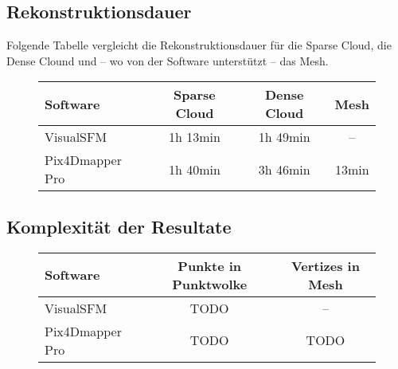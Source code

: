 \subsection{Rekonstruktionsdauer}

Folgende Tabelle vergleicht die Rekonstruktionsdauer für die Sparse Cloud, die
Dense Clound und – wo von der Software unterstützt – das Mesh.

\begin{figure}[H]
	\begin{tabular}[H]{lccc}
		\toprule
		\textbf{Software} & \textbf{Sparse Cloud} & \textbf{Dense Cloud} & \textbf{Mesh} \\
		\midrule
		VisualSFM & 1h 13min & 1h 49min & – \\
		Pix4Dmapper Pro & 1h 40min & 3h 46min & 13min \\
		\bottomrule
	\end{tabular}
\end{figure}

\subsection{Komplexität der Resultate}

\begin{figure}[H]
	\begin{tabular}[H]{lcc}
		\toprule
		\textbf{Software} & \textbf{Punkte in Punktwolke} & \textbf{Vertizes in Mesh} \\
		\midrule
		VisualSFM & TODO & – \\
		Pix4Dmapper Pro & TODO & TODO \\
		\bottomrule
	\end{tabular}
\end{figure}

